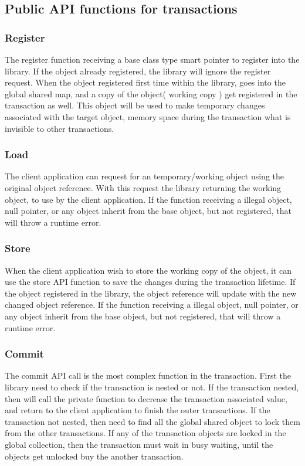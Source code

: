 \documentclass[12pt]{article}
\begin{document}
\subsection{Public API functions for transactions}
\subsubsection{Register}
The register function receiving a base class type smart pointer to register into the library. If the object already registered, the library will ignore the register request. When the object registered first time within the library, goes into the global shared map, and a copy of the object( working copy ) get registered in the transaction as well. This object will be used to make temporary changes associated with the target object, memory space during the transaction what is invisible to other transactions. 

\subsubsection{Load}
The client application can request for an temporary/working object using the original object reference. With this request the library returning the working object, to use by the client application. If the function receiving a illegal object, null pointer, or any object inherit from the base object, but not registered, that will throw a runtime error.

\subsubsection{Store}
When the client application wish to store the working copy of the object, it can use the store API function to save the changes during the transaction lifetime. If the object registered in the library, the object reference will update with the new changed object reference. If the function receiving a illegal object, null pointer, or any object inherit from the base object, but not registered, that will throw a runtime error.

\subsubsection{Commit}
The commit API call is the most complex function in the transaction. First the library need to check if the transaction is nested or not. If the transaction nested, then will call the private function to decrease the transaction associated value, and return to the client application to finish the outer transactions. If the transaction not nested, then need to find all the global shared object to lock them from the other transactions. If any of the transaction objects are locked in the global collection, then the transaction must wait in busy waiting, until the objects get unlocked buy the another transaction.\\
\end{document}
